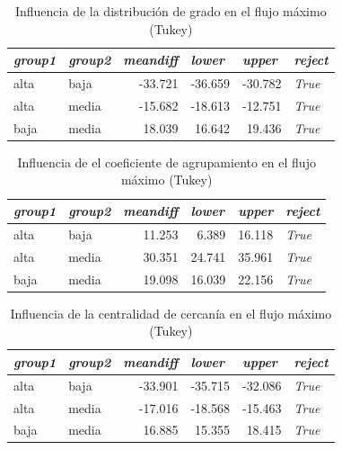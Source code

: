 \documentclass{article}
\begin{document}
\begin{table}[htbp]
  \centering
  \caption{Influencia de la distribución de grado en el flujo máximo (Tukey)}
    \begin{tabular}{llrrrl}
    \toprule
    \textit{\textbf{group1}} & \textit{\textbf{group2}} & \multicolumn{1}{l}{\textit{\textbf{meandiff}}} & \multicolumn{1}{l}{\textit{\textbf{lower}}} & \multicolumn{1}{l}{\textit{\textbf{upper}}} & \textit{\textbf{reject}} \\
    \midrule
    alta  & baja  & -33.721 & -36.659 & -30.782 & \textit{True} \\
    alta  & media & -15.682 & -18.613 & -12.751 & \textit{True} \\
    baja  & media & 18.039 & 16.642 & 19.436 & \textit{True} \\
    \bottomrule
    \end{tabular}%
  \label{tab:t27}%
\end{table}%
\begin{table}[htbp]
  \centering
  \caption{Influencia de el coeficiente de agrupamiento en el flujo máximo (Tukey)}
    \begin{tabular}{llrrrl}
    \toprule
    \textit{\textbf{group1}} & \textit{\textbf{group2}} & \multicolumn{1}{l}{\textit{\textbf{meandiff}}} & \multicolumn{1}{l}{\textit{\textbf{lower}}} & \multicolumn{1}{l}{\textit{\textbf{upper}}} & \textit{\textbf{reject}} \\
    \midrule
    alta  & baja  & 11.253 & 6.389 & 16.118 & \textit{True} \\
    alta  & media & 30.351 & 24.741 & 35.961 & \textit{True} \\
    baja  & media & 19.098 & 16.039 & 22.156 & \textit{True} \\
    \bottomrule
    \end{tabular}%
  \label{tab:t28}%
\end{table}%
\begin{table}[htbp]
  \centering
  \caption{Influencia de la centralidad de cercanía en el flujo máximo (Tukey)}
    \begin{tabular}{llrrrl}
    \toprule
    \textit{\textbf{group1}} & \textit{\textbf{group2}} & \multicolumn{1}{l}{\textit{\textbf{meandiff}}} & \multicolumn{1}{l}{\textit{\textbf{lower}}} & \multicolumn{1}{l}{\textit{\textbf{upper}}} & \textit{\textbf{reject}} \\
    \midrule
    alta  & baja  & -33.901 & -35.715 & -32.086 & \textit{True} \\
    alta  & media & -17.016 & -18.568 & -15.463 & \textit{True} \\
    baja  & media & 16.885 & 15.355 & 18.415 & \textit{True} \\
    \bottomrule
    \end{tabular}%
  \label{tab:t29}%
\end{table}
\end{document}
